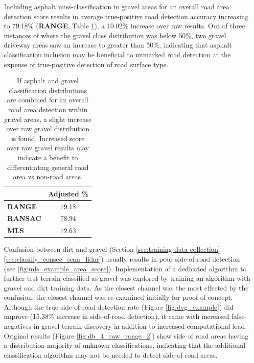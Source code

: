 \documentclass[numbered,pdftex]{ohio-etd}
\begin{document}
{{{		{Including asphalt miss-classification in gravel areas for an overall road area detection score results in average true-positive road detection accuracy increasing to 79.18\% (\textbf{RANGE}, Table \ref{tab:adjusted_grav_avg_score}), a 10.02\% increase over raw results. Out of three instances of where the gravel class distribution was below 50\%, two gravel driveway areas saw an increase to greater than 50\%, indicating that asphalt classification inclusion may be beneficial to unmarked road detection at the expense of true-positive detection of road surface type.}
	
		\begin{table}[H]
			\centering
			\begin{tabular}{l|c}
									& Adjusted \% \\
				\hline
				\textbf{RANGE}  	& 79.18       \\[-4pt]
				\textbf{RANSAC} 	& 78.94       \\[-4pt]
				\textbf{MLS}    	& 72.63      
			\end{tabular}
			\caption[Adjusted Averaged Gravel Area Score]{If asphalt and gravel classification distributions are combined for an overall road area detection within gravel areas, a slight increase over raw gravel distribution is found. Increased score over raw gravel results may indicate a benefit to differentiating general road area vs non-road areas.}
			\label{tab:adjusted_grav_avg_score}
		\end{table}

		{Confusion between dirt and gravel (Section \ref{sec:training-data-collection} \ref{sec:classify_consec_scan_lidar}) usually results in poor side-of-road detection (see \ref{fig:mls_example_area_score}). Implementation of a dedicated algorithm to further test terrain classified as gravel was explored by training an algorithm with gravel and dirt training data. As the closest channel was the most effected by the confusion, the closest channel was re-examined initially for proof of concept. Although the true side-of-road detection rate (Figure \ref{fig:dvg_example}) did improve (15.38\% increase in side-of-road detection), it came with increased false-negatives in gravel terrain discovery in addition to increased computational load. Original results (Figure \ref{fig:db_4_raw_range_2}) show side of road areas having a distribution majority of unknown classifications, indicating that the additional classification algorithm may not be needed to detect side-of-road areas.} 
		
}}}
\end{document}

